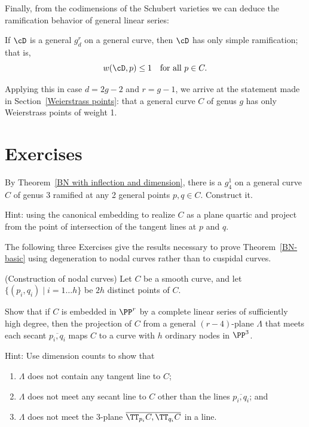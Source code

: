 Finally, from the codimensions of the Schubert varieties  we can deduce the ramification behavior of general
linear series:

\begin{theorem}
If $\cD$ is a general $g^r_d$ on a general curve, then $\cD$ has only simple ramification; that is,	
$$
w(\cD, p) \leq 1 \quad \text{for all } p \in C.
$$
\end{theorem}

Applying this in case $d=2g-2$ and $r = g-1$, we arrive at the statement made in Section~\ref{Weierstrass points}: that a general curve $C$ of genus $g$ has only Weierstrass points of weight 1.

\section{Exercises}

\begin{exercise}
  By Theorem~\ref{BN with inflection and dimension}, there is a $g^1_4$ on a general curve $C$ of genus 3 ramified at any 2 general points $p, q \in C$. Construct it.
  
  Hint: using the canonical embedding to realize $C$ as a plane quartic and project from the point of intersection of the tangent lines at $p$ and $q$.
\end{exercise}

The following three Exercises give the results necessary to prove Theorem~\ref{BN-basic} using degeneration to
nodal curves rather than to cuspidal curves. 

\begin{exercise}\label{independent secants}\label{Constructing nodal curves} (Construction of nodal curves) Let $C$ be a smooth curve,
and let
 $\{(p_{i}, q_{i}) \mid i = 1\dots h\}$ be $2h$ distinct points of $C$.
 
Show that if $C$ is embedded in $\PP^{r}$ by a complete linear series of sufficiently high degree, then the
projection of $C$ from a general $(r-4)$-plane $\Lambda$ that meets each secant $\overline{p_{i}, q_{i}}$
maps $C$ to a curve with $h$ ordinary nodes in $\PP^{3}$.

Hint: Use dimension counts to show that
\begin{enumerate}
\item $\Lambda$ does not contain any tangent line to $C$;
\item $\Lambda$ does not meet any secant line to $C$ other than the lines  $\overline{p_{i}, q_{i}}$; and
\item $\Lambda$ does not meet the 3-plane $\overline{\TT_{p_i}C, \TT_{q_i}C}$ in a line.
\end{enumerate}
 \end{exercise}

